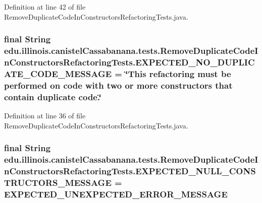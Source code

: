 Definition at line 42 of file RemoveDuplicateCodeInConstructorsRefactoringTests.java.

\hypertarget{classedu_1_1illinois_1_1canistelCassabanana_1_1tests_1_1RemoveDuplicateCodeInConstructorsRefactoringTests_aac8a1c650f75e8dbac2dcd28cfe09d20}{
\subsubsection[{EXPECTED\_\-NO\_\-DUPLICATE\_\-CODE\_\-MESSAGE}]{\setlength{\rightskip}{0pt plus 5cm}final String {\bf edu.illinois.canistelCassabanana.tests.RemoveDuplicateCodeInConstructorsRefactoringTests.EXPECTED\_\-NO\_\-DUPLICATE\_\-CODE\_\-MESSAGE} = \char`\"{}This refactoring must be performed on code with two or more constructors that contain duplicate code.\char`\"{}}}
\label{classedu_1_1illinois_1_1canistelCassabanana_1_1tests_1_1RemoveDuplicateCodeInConstructorsRefactoringTests_aac8a1c650f75e8dbac2dcd28cfe09d20}


Definition at line 36 of file RemoveDuplicateCodeInConstructorsRefactoringTests.java.

\hypertarget{classedu_1_1illinois_1_1canistelCassabanana_1_1tests_1_1RemoveDuplicateCodeInConstructorsRefactoringTests_a1a017b7b7c8607561e8f93423b10b0e0}{
\subsubsection[{EXPECTED\_\-NULL\_\-CONSTRUCTORS\_\-MESSAGE}]{\setlength{\rightskip}{0pt plus 5cm}final String {\bf edu.illinois.canistelCassabanana.tests.RemoveDuplicateCodeInConstructorsRefactoringTests.EXPECTED\_\-NULL\_\-CONSTRUCTORS\_\-MESSAGE} = {\bf EXPECTED\_\-UNEXPECTED\_\-ERROR\_\-MESSAGE}}}
\label{classedu_1_1illinois_1_1canistelCassabanana_1_1tests_1_1RemoveDuplicateCodeInConstructorsRefactoringTests_a1a017b7b7c8607561e8f93423b10b0e0}


